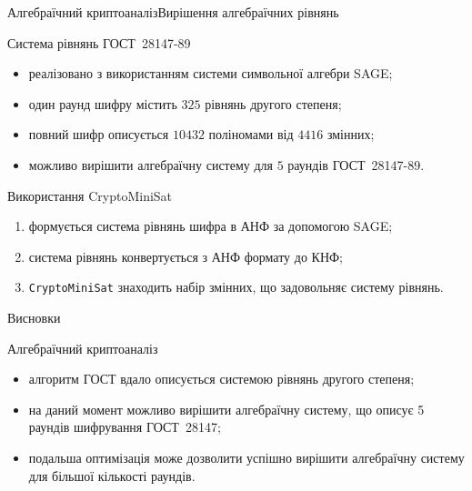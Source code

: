 \documentclass[10pt, ucs]{beamer}
\begin{document}
\begin{frame}{Алгебраїчний криптоаналіз}{Вирішення алгебраїчних рівнянь}
    \small
    \begin{block}{Система рівнянь ГОСТ~28147-89}
        \begin{itemize}
            \item реалізовано з використанням системи символьної алгебри SAGE;
            \item один раунд шифру містить $325$ рівнянь другого степеня;
            \item повний шифр описується $10432$ поліномами від $4416$ змінних;
            \item можливо вирішити алгебраїчну систему для $5$ раундів ГОСТ~28147-89.
        \end{itemize}
    \end{block}

    \begin{block}{Використання CryptoMiniSat}
        \begin{enumerate}
            \item формується система рівнянь шифра в АНФ за допомогою SAGE;
            \item система рівнянь конвертується з АНФ формату до КНФ;
            \item \verb+CryptoMiniSat+ знаходить набір змінних, що задовольняє систему рівнянь. 
        \end{enumerate} 
    \end{block}
    \begin{example}
    \end{example}
\end{frame}

\begin{frame}{Висновки}

    \begin{block}{Алгебраїчний криптоаналіз}
        \begin{itemize}
            \item алгоритм ГОСТ вдало описується системою рівнянь другого степеня;
            \item на даний момент можливо вирішити алгебраїчну систему, що
                описує 5 раундів шифрування ГОСТ~28147;
            \item подальша оптимізація може дозволити успішно вирішити алгебраїчну систему
                для більшої кількості раундів.
        \end{itemize} 
    \end{block}
\end{frame}
\end{document}
